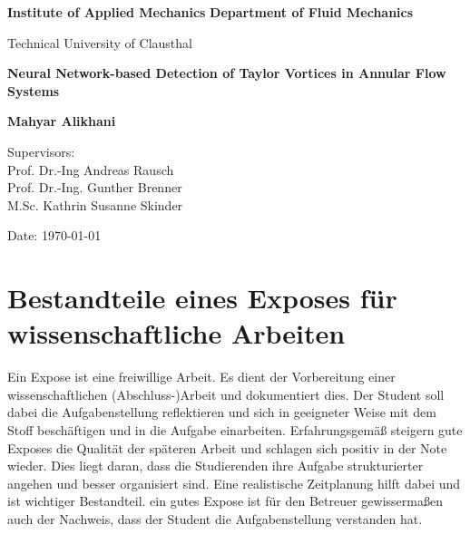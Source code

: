 \documentclass[a4paper,11pt,twoside,final]{scrreprt}
\begin{document}
	
\begin{titlepage}
    \begin{center}
        \vspace*{1cm}
        
        \Huge
        \textbf{Institute of Applied Mechanics}
		\textbf{Department of Fluid Mechanics}
        
        \vspace{0.5cm}
        \LARGE
        Technical University of Clausthal
        
        \vspace{2cm}
        
        
        \vspace{2cm}
        
        
        
        \vspace{1cm}
        
        \textbf{\Huge Neural Network-based Detection of Taylor Vortices in Annular Flow Systems}
        
        \vfill

        \textbf{\LARGE Mahyar Alikhani}
        \vspace{1cm}

		\Large
        Supervisors:\\
		Prof. Dr.-Ing Andreas Rausch \\
		Prof. Dr.-Ing. Gunther Brenner \\
		M.Sc. Kathrin Susanne Skinder

        
        \vspace{0.8cm}
        
        \Large
        Date: \today %
        
    \end{center}
\end{titlepage}
	
\chapter{Bestandteile eines Exposes für wissenschaftliche Arbeiten }
\label{chap:Expose}
	
Ein Expose ist eine freiwillige Arbeit. Es dient der Vorbereitung einer wissenschaftlichen (Abschluss-)Arbeit
und dokumentiert dies. Der Student soll dabei die Aufgabenstellung reflektieren 
und sich in geeigneter Weise mit dem Stoff beschäftigen und in die Aufgabe einarbeiten.
Erfahrungsgemäß steigern gute Exposes die Qualität der späteren Arbeit und schlagen sich positiv in der Note
wieder. Dies liegt daran, dass die Studierenden ihre Aufgabe strukturierter angehen und besser organisiert sind. 
Eine realistische Zeitplanung hilft dabei und ist wichtiger Bestandteil. ein gutes Expose ist für den Betreuer 
gewissermaßen auch der Nachweis, dass der Student die Aufgabenstellung verstanden hat.
\end{document}
